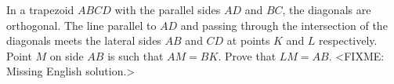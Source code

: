 \problem
In a trapezoid $ABCD$ with the parallel sides $AD$ and $BC$, the diagonals are
orthogonal.
The line parallel to $AD$ and passing through the intersection of the diagonals
meets the lateral sides $AB$ and $CD$ at points $K$ and $L$ respectively.
Point $M$ on side $AB$ is such that $AM = BK$.
Prove that $LM = AB$.
\solution
<FIXME: Missing English solution.>
\endproblem
